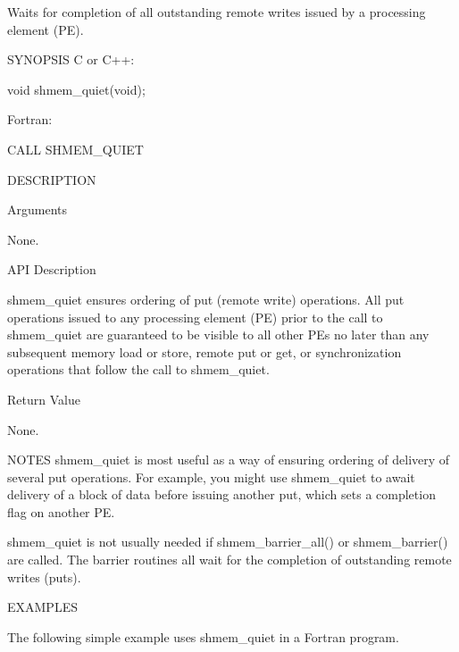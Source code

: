        Waits  for  completion of all outstanding remote writes
       issued by a processing element (PE).

SYNOPSIS
       C or C++:

	  void shmem_quiet(void);

       Fortran:

	  CALL SHMEM_QUIET

DESCRIPTION

Arguments

	None.

API Description

       shmem_quiet ensures ordering of put (remote write) operations.  All put
       operations  issued  to any processing element (PE) prior to the call to
       shmem_quiet are guaranteed to be visible to all other PEs no later than
       any   subsequent	  memory   load	 or  store,  remote  put  or  get,  or
       synchronization operations that follow the call to shmem_quiet.

Return Value

	None.

NOTES
       shmem_quiet is most useful as a way of ensuring ordering of delivery of
       several	put  operations.   For	example,  you might use shmem_quiet to
       await delivery of a block of data before	 issuing  another  put,	 which
       sets a completion flag on another PE.

       shmem_quiet   is	  not	usually	  needed  if  shmem_barrier_all()  or
       shmem_barrier() are called.  The barrier routines  all	wait  for  the
       completion of outstanding remote writes (puts).

EXAMPLES

	The  following  simple  example	uses  shmem_quiet  in a Fortran
       program.	 

	

